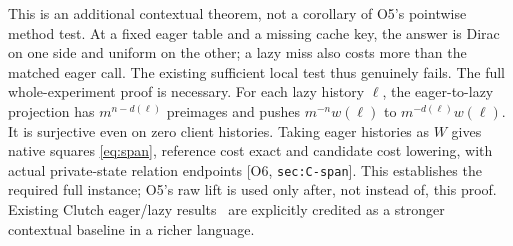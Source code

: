 \documentclass[11pt,a4paper]{article}
\theoremstyle{definition}
\newcommand{\Addr}[2]{\textup{[#1, \texttt{#2}]}}
\begin{document}
This is an additional contextual theorem, not a corollary of O5's
pointwise method test. At a fixed eager table and a missing cache key,
the answer is Dirac on one side and uniform on the other; a lazy miss
also costs more than the matched eager call. The existing sufficient
local test thus genuinely fails. The full whole-experiment proof is
necessary. For each lazy history \(\ell\), the eager-to-lazy projection
has \(m^{n-d(\ell)}\) preimages and pushes
\(m^{-n}w(\ell)\) to \(m^{-d(\ell)}w(\ell)\). It is surjective
even on zero client histories. Taking eager histories as \(W\) gives
native squares \eqref{eq:span}, reference cost exact and candidate cost
lowering, with actual private-state relation endpoints
\Addr{O6}{sec:C-span}. This establishes the required full instance;
O5's raw lift is used only after, not instead of, this proof. Existing
Clutch eager/lazy results~\cite{Clutch} are explicitly credited as a stronger contextual
baseline in a richer language.
\end{document}
